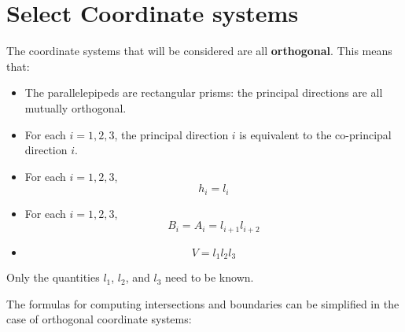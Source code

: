\section{Select Coordinate systems}

The coordinate systems that will be considered are all {\bf orthogonal}. This means that:
\begin{itemize}
\item The parallelepipeds are rectangular prisms: the principal directions are all mutually orthogonal. 
\item For each \(i = 1, 2, 3\), the principal direction \(i\) is equivalent to the co-principal direction \(i\). 
\item For each \(i = 1, 2, 3\), 
\[h_i = l_i\]
\item For each \(i = 1, 2, 3\),
\[B_i = A_i = l_{i+1} l_{i+2}\]
\item 
\[V = l_1 l_2 l_3\]
\end{itemize}
Only the quantities \(l_1\), \(l_2\), and \(l_3\) need to be known.

The formulas for computing intersections and boundaries can be simplified in the case of orthogonal coordinate systems:

